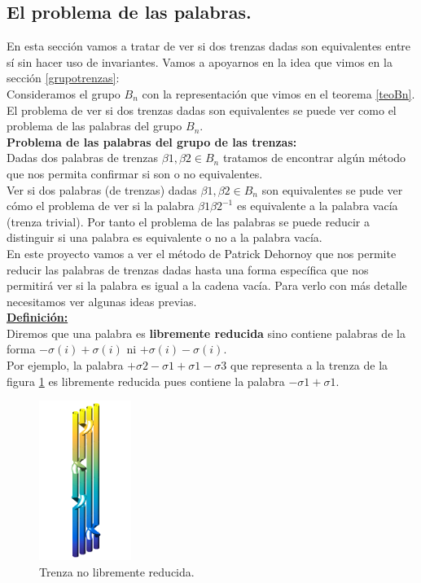\documentclass[14pt]{extarticle}
\begin{document}
\newpage
\subsection{El problema de las palabras.}
En esta sección vamos a tratar de ver si dos trenzas dadas son equivalentes entre sí sin hacer uso de invariantes. Vamos a apoyarnos en la idea que vimos en la sección \ref{grupotrenzas}:\\

Consideramos el grupo $ B_{n} $ con la representación que vimos en el teorema \ref{teoBn}. El problema de ver si dos trenzas dadas son equivalentes se puede ver como el problema de las palabras del grupo $ B_{n} $.\\

\textbf{Problema de las palabras del grupo de las trenzas:}\\
Dadas dos palabras de trenzas $\beta1, \beta2 \in B_{n}$ tratamos de encontrar algún método que nos permita confirmar si son o no equivalentes. \\

Ver si dos palabras (de trenzas) dadas $\beta1, \beta2 \in B_{n}$ son equivalentes se pude ver cómo el problema de ver si la palabra $\beta1\beta2^{-1}$ es equivalente a la palabra vacía (trenza trivial). Por tanto el problema de las palabras se puede reducir a distinguir si una palabra es equivalente o no a la palabra vacía. \\

En este proyecto vamos a ver el método de Patrick Dehornoy que nos permite reducir las palabras de trenzas dadas hasta una forma específica que nos permitirá ver si la palabra es igual a la cadena vacía. Para verlo con más detalle necesitamos ver algunas ideas previas.\\

\underline{\textbf{Definición:}}\\
Diremos que una palabra es \textbf{libremente reducida} sino contiene palabras de la forma $ -\sigma(i)+\sigma(i) $ ni $+\sigma(i)-\sigma(i)$.\\

Por ejemplo, la palabra $+\sigma2-\sigma1+\sigma1-\sigma3$ que representa a la trenza de la figura \ref{deh1} es libremente reducida pues contiene la palabra $-\sigma1+\sigma1$.\\

	\begin{figure}[h!]
		\centering
		\includegraphics[width=3cm]{itrenzas/deh1.png}
		\caption{Trenza no libremente reducida.}
		\label{deh1} 
	\end{figure}
\end{document}
